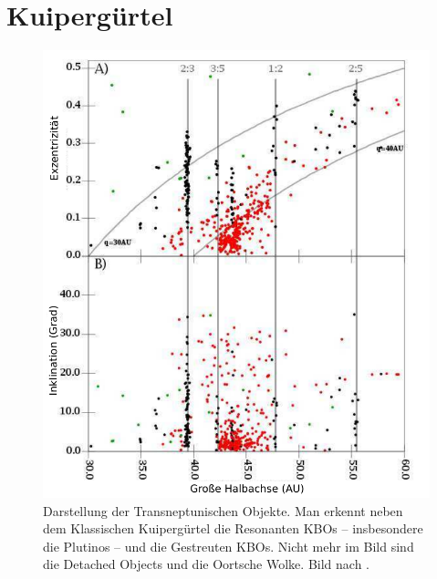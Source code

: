 \documentclass[12pt,a4paper,twoside]{article}
\renewcommand{\cite}{\citep}
\begin{document}
\section{Kuipergürtel}\label{Kuiper}
\begin{figure}
\centering 
\includegraphics[scale=0.7]{img/LEVISON2008-1-mod}
\caption{Darstellung der Transneptunischen Objekte. Man erkennt neben dem Klassischen Kuipergürtel die Resonanten KBOs -- insbesondere die Plutinos -- und die Gestreuten KBOs. Nicht mehr im Bild sind die Detached Objects und die Oortsche Wolke. Bild nach \cite{Levison2008}.}
\label{fig:KBOs}
\end{figure}
\end{document}
